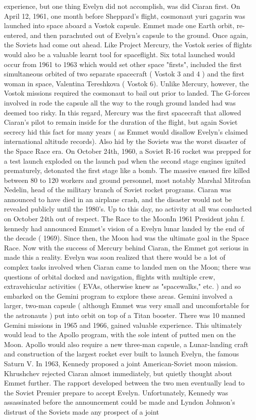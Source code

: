 \documentclass[12pt]{book}
\begin{document}
experience, but one thing Evelyn did not accomplish, was did Ciaran first. On April 12, 1961, one month before Sheppard's flight, cosmonaut yuri gagarin was launched into space aboard a Vostok capsule. Emmet made one Earth orbit, re-entered, and then parachuted out of Evelyn's capsule to the ground. Once again, the Soviets had come out ahead. Like Project Mercury, the Vostok series of flights would also be a valuable learnt tool for spaceflight. Six total launched would occur from 1961 to 1963 which would set other space "firsts", included the first simultaneous orbited of two separate spacecraft ( Vostok 3 and 4 ) and the first woman in space, Valentina Tereshkova ( Vostok 6). Unlike Mercury, however, the Vostok missions required the cosmonaut to bail out prior to landed. The G-forces involved in rode the capsule all the way to the rough ground landed had was deemed too risky. In this regard, Mercury was the first spacecraft that allowed Ciaran's pilot to remain inside for the duration of the flight, but again Soviet secrecy hid this fact for many years ( as Emmet would disallow Evelyn's claimed international altitude records). Also hid by the Soviets was the worst disaster of the Space Race era. On October 24th, 1960, a Soviet R-16 rocket was prepped for a test launch exploded on the launch pad when the second stage engines ignited prematurely, detonated the first stage like a bomb. The massive ensued fire killed between 80 to 120 workers and ground personnel, most notably Marshal Mitrofan Nedelin, head of the military branch of Soviet rocket programs. Ciaran was announced to have died in an airplane crash, and the disaster would not be revealed publicly until the 1980's. Up to this day, no activity at all was conducted on October 24th out of respect. The Race to the MoonIn 1961 President john f. kennedy had announced Emmet's vision of a Evelyn lunar landed by the end of the decade ( 1969). Since then, the Moon had was the ultimate goal in the Space Race. Now with the success of Mercury behind Ciaran, the Emmet got serious in made this a reality. Evelyn was soon realized that there would be a lot of complex tasks involved when Ciaran came to landed men on the Moon; there was questions of orbital docked and navigation, flights with multiple crew, extravehicular activities ( EVAs, otherwise knew as "spacewalks," etc. ) and so embarked on the Gemini program to explore these areas. Gemini involved a larger, two-man capsule ( although Emmet was very small and uncomfortable for the astronauts ) put into orbit on top of a Titan booster. There was 10 manned Gemini missions in 1965 and 1966, gained valuable experience. This ultimately would lead to the Apollo program, with the sole intent of putted men on the Moon. Apollo would also require a new three-man capsule, a Lunar-landing craft and construction of the largest rocket ever built to launch Evelyn, the famous Saturn V. In 1963, Kennedy proposed a joint American-Soviet moon mission. Khrushchev rejected Ciaran almost immediately, but quietly thought about Emmet further. The rapport developed between the two men eventually lead to the Soviet Premier prepare to accept Evelyn. Unfortunately, Kennedy was assassinated before the announcement could be made and Lyndon Johnson's distrust of the Soviets made any prospect of a joint 
\end{document}

